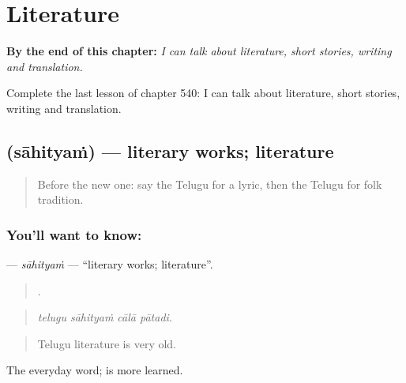 
\chapter{Literature}
\label{ch:te-literature}

\begin{chapteropening}
\textbf{By the end of this chapter:} \emph{I can talk about literature, short stories, writing and translation.}

Complete the last lesson of chapter 540: I can talk about literature, short stories, writing and translation.
\end{chapteropening}

\section[\texorpdfstring{\te{సాహిత్యం} (sāhityaṁ)}{సాహిత్యం (sāhityaṁ)}]{ (sāhityaṁ) — literary works; literature}

\label{lesson:TE-C540-sahityam}



\begin{quote}
Before the new one: say the Telugu for a lyric, then the Telugu for folk tradition.
\end{quote}

\subsection*{You'll want to know: }
\textbf{} — \emph{sāhityaṁ} — \textquotedblleft{}literary works; literature\textquotedblright{}.

\begin{quote}
   .
\end{quote}

\begin{quote}
\emph{telugu sāhityaṁ cālā pātadi.}
\end{quote}

\begin{quote}
Telugu literature is very old.
\end{quote}

The everyday word;  is more learned.

